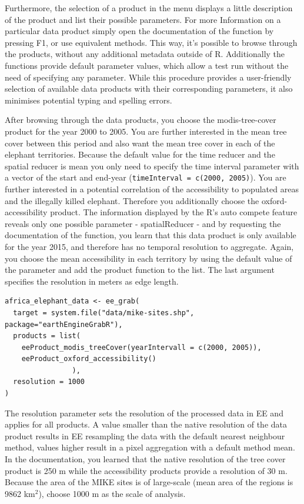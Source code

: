 Furthermore, the selection of a product in the menu displays a little description of the product and list their possible parameters. For more Information on a particular data product simply open the documentation of the function by pressing F1, or use equivalent methods. This way, it's possible to browse through the products, without any additional metadata outside of R. Additionally the functions provide default parameter values, which allow a test run without the need of specifying any parameter. While this procedure provides a user-friendly selection of available data products with their corresponding parameters, it also minimises potential typing and spelling errors.

After browsing through the data products, you choose the modis-tree-cover product for the year 2000 to 2005. You are further interested in the mean tree cover between this period and also want the mean tree cover in each of the elephant territories. Because the default value for the time reducer and the spatial reducer is mean you only need to specify the time interval parameter with a vector of the start and end-year (\texttt{timeInterval = c(2000, 2005)}). You are further interested in a potential correlation of the accessibility to populated areas and the illegally killed elephant. Therefore you additionally choose the oxford-accessibility product. The information displayed by the R's auto compete feature reveals only one possible parameter - spatialReducer - and by requesting the documentation of the function, you learn that this data product is only available for the year 2015, and therefore has no temporal resolution to aggregate. Again, you choose the mean accessibility in each territory by using the default value of the parameter and add the product function to the list. The last argument specifies the resolution in meters as edge length. 


\begin{lstlisting}
africa_elephant_data <- ee_grab(
  target = system.file("data/mike-sites.shp", package="earthEngineGrabR"),
  products = list(
    eeProduct_modis_treeCover(yearIntervall = c(2000, 2005)),
    eeProduct_oxford_accessibility()
                ),
  resolution = 1000
)

\end{lstlisting}

The resolution parameter sets the resolution of the processed data in EE and applies for all products. A value smaller than the native resolution of the data product results in EE resampling the data with the default nearest neighbour method, values higher result in a pixel aggregation with a default method mean. In the documentation, you learned that the native resolution of the tree cover product is 250 m while the accessibility products provide a resolution of 30 m. Because the area of the MIKE sites is of large-scale (mean area of the regions is 9862 km$^2$), choose 1000 m as the scale of analysis. 



